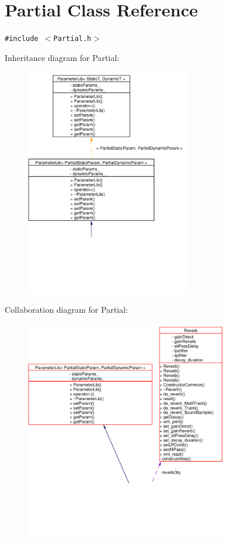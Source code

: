 \hypertarget{classPartial}{
\section{Partial Class Reference}
\label{classPartial}
}
{\tt \#include $<$Partial.h$>$}

Inheritance diagram for Partial:\begin{figure}[H]
\begin{center}
\leavevmode
\includegraphics[width=205pt]{classPartial__inherit__graph}
\end{center}
\end{figure}
Collaboration diagram for Partial:\begin{figure}[H]
\begin{center}
\leavevmode
\includegraphics[width=248pt]{classPartial__coll__graph}
\end{center}
\end{figure}
